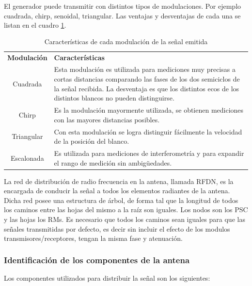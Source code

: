 El generador puede transmitir con distintos tipos de modulaciones. Por ejemplo cuadrada, chirp, senoidal, triangular. Las ventajas y
desventajas de cada una se listan en el cuadro \ref{tab:modulations}.

\begin{table}[H]
  \footnotesize
  \centering
  \begin{tabular}{|c|p{9cm}|}
	\hline
	\textbf{Modulación} & \textbf{Características} \\
	Cuadrada & Esta modulación es utilizada para mediciones muy precisas a cortas distancias comparando las fases de los dos
	semiciclos de la señal recibida. La desventaja es que los distintos ecos de los distintos blancos no pueden distinguirse.\\\hline
	Chirp & Es la modulación mayormente utilizada, se obtienen mediciones con las mayores distancias posibles.\\\hline
	Triangular & Con esta modulación se logra distinguir fácilmente la velocidad de la posición del blanco. \\\hline
	Escalonada & Es utilizada para mediciones de interferometría y para expandir el rango de medición sin ambig\"uedades.\\\hline
  \end{tabular}
  \caption{Características de cada modulación de la señal emitida}
  \label{tab:modulations}
\end{table}

La red de distribución de radio frecuencia en la antena, llamada RFDN, es la encargada de conducir la señal a todos los 
elementos radiantes de la antena. Dicha red posee una estructura de árbol, de forma tal que la longitud de todos los caminos
entre las hojas del mismo a la raíz son iguales. Los nodos son los PSC y las hojas los RMs. Es necesario que todos los caminos
sean iguales para que las señales transmitidas por defecto, es decir sin incluir el efecto de los modulos 
transmisores/receptores, tengan la misma fase y atenuación. 


\subsubsection{Identificación de los componentes de la antena}

Los componentes utilizados para distribuir la señal son los siguientes:

